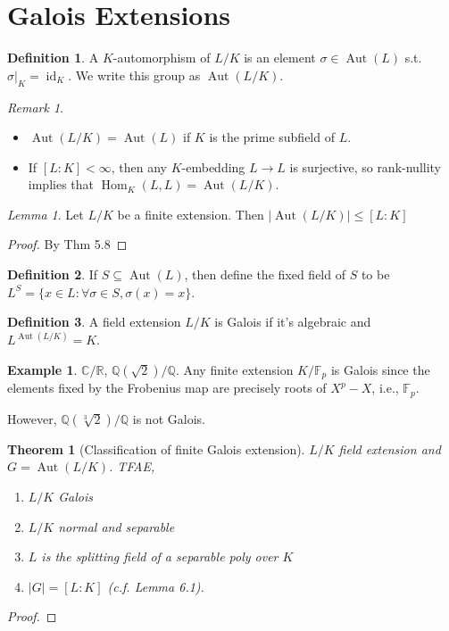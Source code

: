 \documentclass{article}
\theoremstyle{definition}
\newtheorem*{defn*}{Definition}
\newtheorem{example}[defn]{Example}
\theoremstyle{remark}
\newtheorem{rem}{Remark}
\newtheorem{lem}[defn]{Lemma}
\theoremstyle{plain}
\newtheorem{thm}[defn]{Theorem}
\newcommand{\QQ}{\mathbb{Q}}
\newcommand{\RR}{\mathbb{R}}
\newcommand{\CC}{\mathbb{C}}
\newcommand{\FF}{\mathbb{F}}
\newcommand{\Hom}{\operatorname{Hom}}
\newcommand{\Aut}{\operatorname{Aut}}
\begin{document}
\section{Galois Extensions}
\begin{defn*}
    A $K$-automorphism of $L/K$ is an element $\sigma\in\Aut(L)$ s.t. $\sigma|_K=\operatorname{id}_K$. We write this group as $\Aut(L/K)$.
\end{defn*}
\begin{rem}
    \begin{itemize}
        \item $\Aut(L/K)=\Aut(L)$ if $K$ is the prime subfield of $L$.
        \item If $[L:K]<\infty$, then any $K$-embedding $L\to L$ is surjective, so rank-nullity implies that $\Hom_K(L,L)=\Aut(L/K)$.
    \end{itemize}
\end{rem}
\begin{lem}
    Let $L/K$ be a finite extension. Then $|\Aut(L/K)|\le [L:K]$
\end{lem}
\begin{proof}
    By Thm 5.8
\end{proof}
\begin{defn*}
    If $S\subseteq\Aut(L)$, then define the fixed field of $S$ to be $L^S=\{x\in L:\forall\sigma\in S,\sigma(x)=x\}$.
\end{defn*}
\begin{defn*}
    A field extension $L/K$ is Galois if it's algebraic and $L^{\Aut(L/K)}=K$.
\end{defn*}
\begin{example}
    $\CC/\RR$, $\QQ(\sqrt{2})/\QQ$. Any finite extension $K/\FF_p$ is Galois since the elements fixed by the Frobenius map are precisely roots of $X^p-X$, i.e., $\FF_p$.

    However, $\QQ(\sqrt[3]{2})/\QQ$ is not Galois.
\end{example}
\begin{thm}[Classification of finite Galois extension]
    $L/K$ field extension and $G=\Aut(L/K)$. TFAE,
    \begin{enumerate}
        \item $L/K$ Galois
        \item $L/K$ normal and separable
        \item $L$ is the splitting field of a separable poly over $K$
        \item $|G|=[L:K]$ (c.f. Lemma 6.1).
    \end{enumerate}
\end{thm}
\begin{proof}
    
\end{proof}
\end{document}
